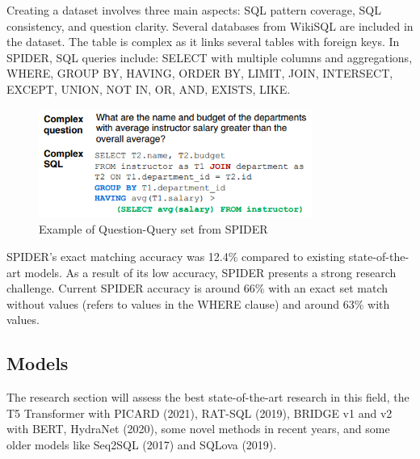 Creating a dataset involves three main aspects: SQL pattern coverage, SQL consistency, and question clarity. Several databases from WikiSQL are included in the dataset. The table is complex as it links several tables with foreign keys. In SPIDER, SQL queries include: SELECT with multiple columns and aggregations, WHERE, GROUP BY, HAVING, ORDER BY, LIMIT, JOIN, INTERSECT, EXCEPT, UNION, NOT IN, OR, AND, EXISTS, LIKE.

\begin{figure}[htb]
    \centering
    \includegraphics[width=0.8\textwidth]{pics/db/Spider2.png}
    \caption{Example of Question-Query set from SPIDER}
    \label{fig:Spider2}
\end{figure}

SPIDER's exact matching accuracy was 12.4\% compared to existing state-of-the-art models. As a result of its low accuracy, SPIDER presents a strong research challenge. Current SPIDER accuracy is around 66\% with an exact set match without values (refers to values in the WHERE clause) and around 63\% with values.

\subsection*{Models}

The research section will assess the best state-of-the-art research in this field, the T5\cite{raffel_exploring_2020} Transformer with PICARD\cite{scholak_picard_2021} (2021), RAT-SQL\cite{wang_rat-sql_2021} (2019), BRIDGE v1 and v2\cite{lin_bridging_2020} with BERT, HydraNet\cite{lyu_hybrid_2020} (2020), some novel methods in recent years, and some older models like Seq2SQL\cite{zhong_seq2sql_2017} (2017) and SQLova\cite{hwang_comprehensive_2019} (2019).

